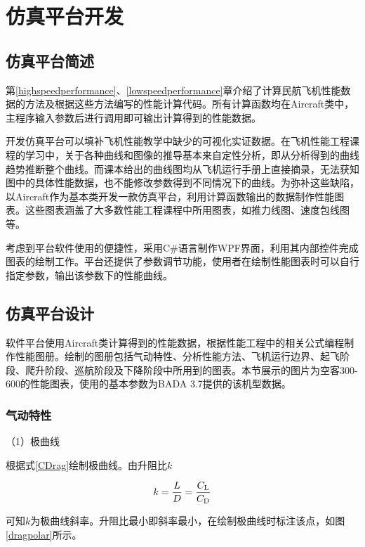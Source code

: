 \documentclass[a4paper,punct,space,heading=true,AutoFakeBold]{ctexrep}
\begin{document}
\chapter{仿真平台开发}

\section{仿真平台简述}

第\ref{highspeedperformance}、\ref{lowspeedperformance}章介绍了计算民航飞机性能数据的方法及根据这些方法编写的性能计算代码。所有计算函数均在Aircraft类中，主程序输入参数后进行调用即可输出计算得到的性能数据。

开发仿真平台可以填补飞机性能教学中缺少的可视化实证数据。在飞机性能工程课程的学习中，关于各种曲线和图像的推导基本来自定性分析，即从分析得到的曲线趋势推断整个曲线。而课本给出的曲线图均从飞机运行手册上直接摘录，无法获知图中的具体性能数据，也不能修改参数得到不同情况下的曲线。为弥补这些缺陷，以Aircraft作为基本类开发一款仿真平台，利用计算函数输出的数据制作性能图表。这些图表涵盖了大多数性能工程课程中所用图表，如推力线图、速度包线图等。

考虑到平台软件使用的便捷性，采用C\#语言制作WPF界面，利用其内部控件完成图表的绘制工作。平台还提供了参数调节功能，使用者在绘制性能图表时可以自行指定参数，输出该参数下的性能曲线。


\section{仿真平台设计}

软件平台使用Aircraft类计算得到的性能数据，根据性能工程中的相关公式编程制作性能图册\cite{PerformaceCourse}。绘制的图册包括气动特性、分析性能方法、飞机运行边界、起飞阶段、爬升阶段、巡航阶段及下降阶段中所用到的图表。本节展示的图片为空客300-600的性能图表，使用的基本参数为BADA 3.7提供的该机型数据。

\subsection{气动特性}\label{Dcurve}

（1）极曲线

根据式\ref{CDrag}绘制极曲线。由升阻比$k$

\begin{equation}
k=\frac{L}{D}=\frac{C_{\rm L}}{C_{\rm D}}
\end{equation}

可知$k$为极曲线斜率。升阻比最小即斜率最小，在绘制极曲线时标注该点，如图\ref{dragpolar}所示。
\end{document}
